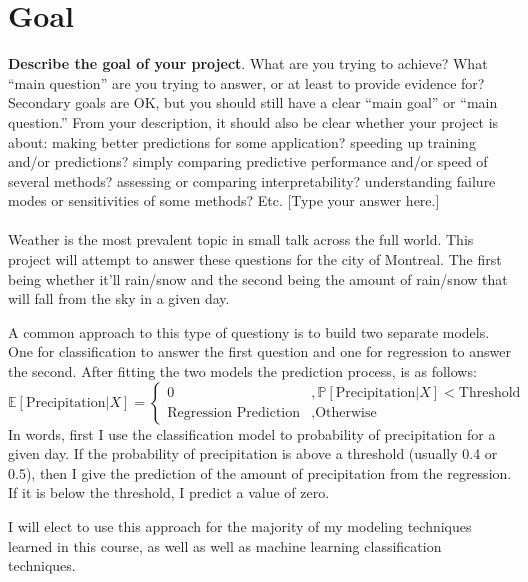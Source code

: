 \documentclass[a4paper,11pt]{article}
\newcommand{\E}{\mathbb{E}}
\newcommand{\prob}{\mathbb{P}}
\begin{document}
\newpage

\section{Goal}

\textbf{Describe the goal of your project}. What are you trying to achieve? What “main question” are you trying to answer, or at least to provide evidence for? Secondary goals are OK, but you should still have a clear “main goal” or “main question.” From your description, it should also be clear whether your project is about: making better predictions for some application? speeding up training and/or predictions? simply comparing predictive performance and/or speed of several methods? assessing or comparing interpretability? understanding failure modes or sensitivities of some methods? Etc.
[Type your answer here.]
\\
\\
Weather is the most prevalent topic in small talk across the full world. 
This project will attempt to answer these questions for the city of Montreal.  The first being whether it'll rain/snow and the second being the amount of rain/snow that will fall from the sky in a given day.\par
A common approach to this type of questiony is to build two separate models.  One for classification to answer the first question and one for regression to answer the second.  After fitting the two models the prediction process, is as follows:
$$
\E[\text{Precipitation}|X] =\left\{
        \begin{array}{ll}
            0 & ,\prob[\text{Precipitation}|X] < \text{Threshold}\\
            \text{Regression Prediction} &, \text{Otherwise}
        \end{array}
    \right.
$$
In words, first I use the classification model to probability of precipitation for a given day.  If the probability of precipitation is above a threshold (usually 0.4 or 0.5), then I give the prediction of the amount of precipitation from the regression.  If it is below the threshold, I predict a value of zero.\par
I will elect to use this approach for the majority of my modeling techniques learned in this course, as well as well as machine learning classification techniques.  


\newpage
\end{document}
